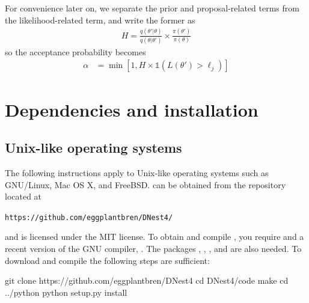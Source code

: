 \documentclass[article]{jss}
\newcommand{\params}{\theta}
\begin{document}
For convenience later on, we 
separate the prior and proposal-related terms from
the likelihood-related term, and write the former as
\begin{align}
H = \frac{q(\params'|\params)}{q(\params | \params')}
\times \frac{\pi(\params')}{\pi(\params)}
\end{align}
so the acceptance probability becomes
\begin{align}
\alpha &= \min\left[1,
H\times
\mathds{1}\left(L(\params') > \ell_j\right)
\right]
\end{align}








\section{Dependencies and installation}\label{sec:installation}

\subsection{Unix-like operating systems}
The following instructions apply to Unix-like operating systems such as
GNU/Linux, Mac OS X, and FreeBSD.
 can be obtained from the  repository located at
\begin{center}
{\tt https://github.com/eggplantbren/DNest4/}\\
\end{center}
and is licensed under the
MIT license. To obtain and compile ,
you require  and a recent version of the GNU
 compiler, . The 
packages , ,
, and  are also needed.
To download and compile 
the following steps are sufficient:
\begin{CodeChunk}
\begin{CodeInput}
git clone https://github.com/eggplantbren/DNest4
cd DNest4/code
make
cd ../python
python setup.py install
\end{CodeInput}
\end{CodeChunk}
\end{document}
